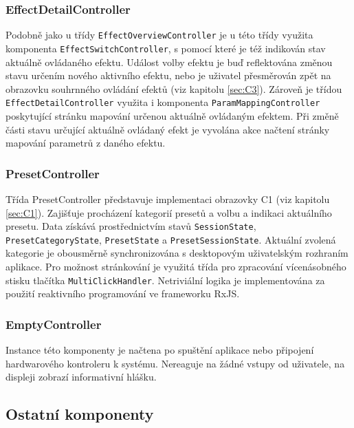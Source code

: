\documentclass[thesis=M,czech]{FITthesis}[2019/03/06]
\begin{document}
			\subsubsection{EffectDetailController}
				Podobně jako u třídy \texttt{Effect\-Overview\-Controller} je u této třídy využita komponenta \texttt{Effect\-Switch\-Controller},
				s pomocí které je též indikován stav aktuálně ovládaného efektu. Událost volby efektu je buď 
				reflektována změnou stavu určením nového aktivního efektu, nebo je uživatel přesměrován zpět na obrazovku souhrnného ovládání efektů (viz kapitolu \ref{sec:C3}).
				Zároveň je třídou \texttt{Effect\-Detail\-Controller} využita i komponenta \texttt{Param\-Mapping\-Controller} poskytující
				stránku mapování určenou aktuálně ovládaným efektem. Při změně části stavu určující aktuálně ovládaný efekt
				je vyvolána akce načtení stránky mapování parametrů z daného efektu.
		
			\subsubsection{PresetController}
				Třída PresetController představuje implementaci obrazovky C1 (viz kapitolu \ref{sec:C1}). 
				Zajišťuje procházení kategorií presetů a volbu a indikaci aktuálního presetu.
				Data získává prostřednictvím stavů \texttt{SessionState}, \texttt{Preset\-Category\-State}, \texttt{PresetState} a \texttt{Preset\-Session\-State}.
				Aktuální zvolená kategorie je obousměrně synchronizována s desktopovým uživatelským rozhraním aplikace.
				Pro možnost stránkování je využitá třída pro zpracování vícenásobného stisku tlačítka \texttt{Multi\-Click\-Handler}.
				Netriviální logika je implementována za použití reaktivního programování ve frameworku RxJS.
		
			\subsubsection{EmptyController}
				Instance této komponenty je načtena po spuštění aplikace nebo připojení hardwarového kontroleru k systému. Nereaguje na žádné vstupy od uživatele, na displeji zobrazí informativní hlášku.
						
		
		\subsection{Ostatní komponenty}
\end{document}
